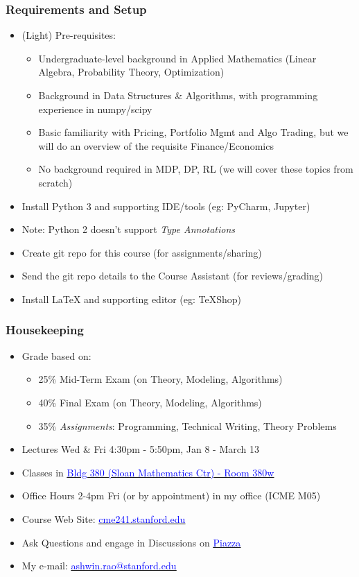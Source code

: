 \documentclass[handout]{beamer}
\begin{document}
\begin{frame}
\frametitle{Requirements and Setup}
\pause
\begin{itemize}[<+->]
\item (Light) Pre-requisites:
\begin{itemize}
\item Undergraduate-level background in Applied Mathematics (Linear Algebra, Probability Theory, Optimization)
\item Background in Data Structures \& Algorithms, with programming experience in numpy/scipy
\item Basic familiarity with Pricing, Portfolio Mgmt and Algo Trading, but we will do an overview of the requisite Finance/Economics
\item No background required in MDP, DP, RL (we will cover these topics from scratch)
\end{itemize}
\item Install Python 3 and supporting IDE/tools (eg: PyCharm, Jupyter)
\item Note: Python 2 doesn't support {\em Type Annotations}
\item Create git repo for this course (for assignments/sharing)
\item Send the git repo details to the Course Assistant (for reviews/grading)
\item Install LaTeX and supporting editor (eg: TeXShop)
\end{itemize}
\end{frame}


\begin{frame}
\frametitle{Housekeeping}
\pause
\begin{itemize}[<+->]
\item Grade based on:
\begin{itemize}
\item 25\% Mid-Term Exam (on Theory, Modeling, Algorithms)
\item 40\% Final Exam (on Theory, Modeling, Algorithms)
\item 35\% {\em Assignments}: Programming,  Technical Writing, Theory Problems
\end{itemize}
\item Lectures Wed \& Fri 4:30pm - 5:50pm, Jan 8  - March 13
\item Classes in \href{https://campus-map.stanford.edu/?srch=380-380W}{\underline{\textcolor{blue}{Bldg 380 (Sloan Mathematics Ctr) - Room 380w}}}
\item Office Hours 2-4pm Fri (or by appointment) in my office (ICME M05)
\item Course Web Site: \href{http://cme241.stanford.edu}{\underline{\textcolor{blue}{cme241.stanford.edu}}}
\item Ask Questions and engage in Discussions on \href{https://piazza.com/stanford/winter2020/cme241/home}{\underline{\textcolor{blue}{Piazza}}}
\item My e-mail: \href{mailto:ashwin.rao@stanford.edu}{\underline{\textcolor{blue}{ashwin.rao@stanford.edu}}}
\end{itemize}
\end{frame}
\end{document}
